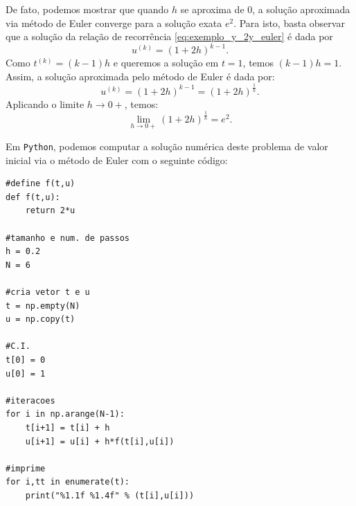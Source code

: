 \begin{ex}
De fato, podemos mostrar que quando $h$ se aproxima de $0$, a solução aproximada via método de Euler converge para a solução exata $e^2$. Para isto, basta observar que a solução da relação de recorrência \eqref{eq:exemplo_y_2y_euler} é dada por
 \begin{equation} u^{(k)}=(1+2h)^{k-1}. \end{equation}
 Como $t^{(k)}=(k-1)h$ e queremos a solução em $t=1$, temos $(k-1)h=1$. Assim, a solução aproximada pelo método de Euler é dada por:
 \begin{equation}
 u^{(k)}= (1+2h)^{k-1}= (1+2h)^{\frac{1}{h}}.
 \end{equation}
Aplicando o limite $h\to 0+$, temos:
  \begin{equation}
  \lim_{h\to 0+} (1+2h)^{\frac{1}{h}}= e^{2}.
  \end{equation}

\ifispython
Em \verb+Python+, podemos computar a solução numérica deste problema de valor inicial via o método de Euler com o seguinte código:
\begin{verbatim}
#define f(t,u)
def f(t,u):
    return 2*u

#tamanho e num. de passos
h = 0.2
N = 6

#cria vetor t e u
t = np.empty(N)
u = np.copy(t)

#C.I.
t[0] = 0
u[0] = 1

#iteracoes
for i in np.arange(N-1):
    t[i+1] = t[i] + h
    u[i+1] = u[i] + h*f(t[i],u[i])

#imprime
for i,tt in enumerate(t):
    print("%1.1f %1.4f" % (t[i],u[i]))
\end{verbatim}
\fi
\end{ex}

